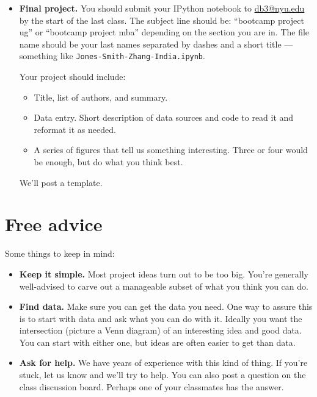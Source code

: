 \documentclass[11pt]{article}
\begin{document}
\begin{itemize}
\item {\bf Final project.}
You should submit your IPython notebook to \href{mailto:db3@nyu.edu}{db3@nyu.edu}
by the start of the last class.
The subject line should be:  ``bootcamp project ug'' or ``bootcamp project mba''
depending on the section you are in.
The file name should be your last names separated by dashes and a short title ---
something like {\tt Jones-Smith-Zhang-India.ipynb}.

Your project should include:
\begin{itemize}
\item Title, list of authors, and summary.
\item Data entry.  Short description of data sources and code to read it
and reformat it as needed.
\item A series of figures that tell us something interesting.
Three or four would be enough, but do what you think best.
\end{itemize}
We'll post a template.
\end{itemize}


\section*{Free advice}

Some things to keep in mind:
%
\begin{itemize}
\item {\bf Keep it simple.}
Most project ideas turn out to be too big.  You're generally well-advised
to carve out a manageable subset of what you think you can do.

\item {\bf Find data.}  Make sure you can get the data you need.
One way to assure this is to start with data and ask what you can do with it.
Ideally you want the intersection (picture a Venn diagram) of an interesting
idea and good data.  You can start with either one, but ideas are often easier to
get than data.

\item {\bf Ask for help.}
We have years of experience with this kind of thing.
If you're stuck, let us know and we'll try to help.
You can also post a question on the class discussion board.
Perhaps one of your classmates has the answer.

\end{itemize}





\end{document}
